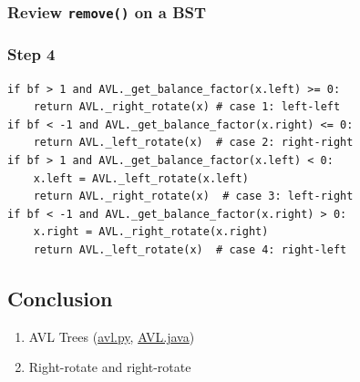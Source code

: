 \documentclass[aspectratio=169, 14pt]{beamer}
\begin{document}
\begin{frame}
    \frametitle{Review \texttt{remove()} on a BST}
\end{frame}

\begin{frame}[fragile]
    \frametitle{Step 4}
    \begin{verbatim}
if bf > 1 and AVL._get_balance_factor(x.left) >= 0:
    return AVL._right_rotate(x) # case 1: left-left
if bf < -1 and AVL._get_balance_factor(x.right) <= 0:
    return AVL._left_rotate(x)  # case 2: right-right
if bf > 1 and AVL._get_balance_factor(x.left) < 0:
    x.left = AVL._left_rotate(x.left)
    return AVL._right_rotate(x)  # case 3: left-right
if bf < -1 and AVL._get_balance_factor(x.right) > 0:
    x.right = AVL._right_rotate(x.right)
    return AVL._left_rotate(x)  # case 4: right-left
    \end{verbatim}

\end{frame}


\begin{frame}
  
    \section{\textcolor{darkmidnightblue}{Conclusion}} 
  
    \begin{enumerate}
      \item AVL Trees (\href{https://github.com/ChenZhongPu/data-structure-swufe/blob/master/code/python/tree/avl.py}{avl.py}, \href{https://github.com/ChenZhongPu/data-structure-swufe/blob/master/code/java/tree/src/main/java/org/swufe/AVL.java}{AVL.java})
      \item Right-rotate and right-rotate
    \end{enumerate}
  \end{frame}
\end{document}
